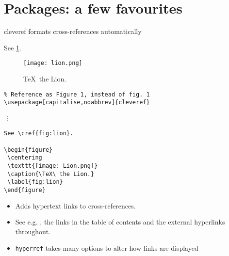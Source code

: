 \section{Packages: a few favourites}

\begin{frame}{\href{https://ctan.org/pkg/cleveref?lang=en}%
                   {}}
  cleveref formats cross-references automatically

  See \cref{fig:lion}.
  \begin{figure}
    \centering
    \texttt{[image: lion.png]}
    \caption{\TeX\ the Lion.}
    \label{fig:lion}
  \end{figure}
\end{frame}

\begin{frame}[fragile]{\href{https://ctan.org/pkg/cleveref?lang=en}%
                            {}}
  \begin{lstlisting}
% Reference as Figure 1, instead of fig. 1
\usepackage[capitalise,noabbrev]{cleveref}
  \end{lstlisting}
  \vspace{-0.1cm}\hspace{0.25cm}\vdots 
  \begin{lstlisting}
See \cref{fig:lion}.

\begin{figure}
 \centering
 \texttt{[image: Lion.png]}
 \caption{\TeX\ the Lion.}
 \label{fig:lion}
\end{figure}
  \end{lstlisting}
\end{frame}

\begin{frame}{\href{https://ctan.org/pkg/hyperref?lang=en}%
                   {}}
  \begin{itemize}
    \item Adds hypertext links to cross-references.
    \item See e.g. \hyperlink{toc}%
	    {\color{link_purple}{this link to the Table of Contents}}, the links
      in the table of contents and the external hyperlinks throughout.
    \item \texttt{hyperref} takes many options to alter how links are displayed
  \end{itemize}
\end{frame}

